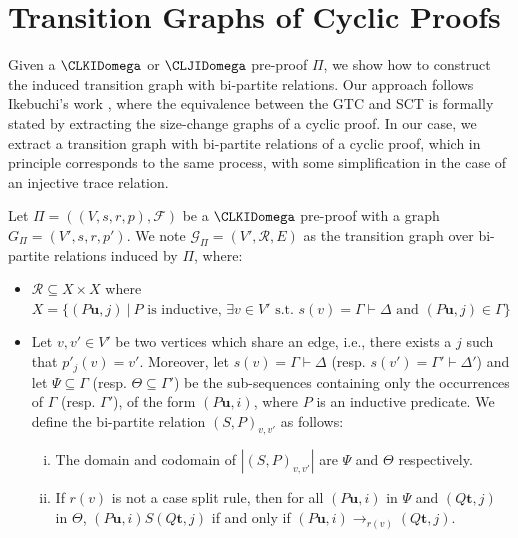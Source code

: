 \section{Transition Graphs of Cyclic Proofs}
\label{sec:transition-graph-proofs}

Given a $\CLKIDomega$ or $\CLJIDomega$ pre-proof $\Pi$, we show how to construct the induced transition graph with bi-partite relations. Our approach follows Ikebuchi's work \cite{Mirai}, where the equivalence between the GTC and SCT is formally stated by extracting the size-change graphs of a cyclic proof. In our case, we extract a transition graph with bi-partite relations of a cyclic proof, which in principle corresponds to the same process, with some simplification in the case of an injective trace relation.

\begin{definition}
\label{def:preProofTrans}

Let $\Pi = ((V, s, r, p), \mathcal{F})$ be a $\CLKIDomega$ pre-proof with a graph $G_{\Pi} = (V',s,r,p')$. We note $\mathcal{G}_{\Pi} = (V', \mathcal{R}, E)$ as the transition graph over bi-partite relations induced by $\Pi$, where:
\begin{itemize}

     \item $\mathcal{R} \subseteq X \times X$ where $X = \{ (P\mathbf{u},j) \ | \ \text{$P$ is inductive, $\exists v \in V'$ s.t. $s(v) = \Gamma \vdash \Delta$ and $(P\mathbf{u},j) \in \Gamma$} \}$

     \item Let $v,v' \in V'$ be two vertices which share an edge, i.e., there exists a $j$ such that $p'_j(v) = v'$. Moreover, let $s(v) = \Gamma \vdash \Delta$ (resp. $s(v') = \Gamma' \vdash \Delta'$) and let $\Psi \subseteq \Gamma$ (resp. $\Theta \subseteq \Gamma'$)
     be the sub-sequences containing only the occurrences of $\Gamma$ (resp. $\Gamma'$), of the form $(P\mathbf{u}, i)$, where $P$ is an inductive predicate. We define the bi-partite relation $(S,P)_{v,v'}$ as follows:
        \begin{enumerate}[i)]
            \item The domain and codomain of $|(S,P)_{v,v'}|$ are $\Psi$ and $\Theta$ respectively.
            

            \item If $r(v)$ is not a case split rule, then for all $(P\mathbf{u},i)$ in $\Psi$ and $(Q\mathbf{t},j)$ in $\Theta$, $(P\mathbf{u},i) S (Q\mathbf{t},j)$ if and only if $(P\mathbf{u},i) \rightarrow_{r(v)} (Q\mathbf{t},j)$.


\end{enumerate}
\end{itemize}
\end{definition}
